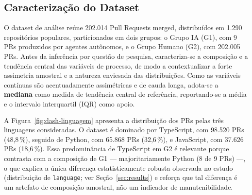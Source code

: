 %
%



\subsection{Caracterização do Dataset}
\label{sec:caracterizacao}

O dataset de análise reúne 202.014 Pull Requests merged, distribuídos em
1.290 repositórios populares, particionados em dois grupos: o Grupo IA (G1),
com 9 PRs produzidos por agentes autônomos, e o Grupo Humano (G2), com
202.005 PRs. Antes da inferência por questão de pesquisa, caracteriza-se a
composição e a tendência central das variáveis de processo, de modo a
contextualizar a forte assimetria amostral e a natureza enviesada das
distribuições. Como as variáveis contínuas são acentuadamente assimétricas e
de cauda longa, adota-se a \textbf{mediana} como medida de tendência central
de referência, reportando-se a média e o intervalo interquartil (IQR) como
apoio.

A Figura~\ref{fig:dash-linguagem} apresenta a distribuição dos PRs pelas três
linguagens consideradas. O dataset é dominado por TypeScript, com 98.520 PRs
(48,8\,\%), seguido de Python, com 65.868 PRs (32,6\,\%), e JavaScript, com
37.626 PRs (18,6\,\%). Essa predominância de TypeScript em G2 é relevante
porque contrasta com a composição de G1 --- majoritariamente Python (8 de 9
PRs) ---, o que explica a única diferença estatisticamente robusta observada
no estudo (distribuição de \texttt{language}; ver Seção~\ref{sec:results}) e
reforça que tal diferença é um artefato de composição amostral, não um
indicador de manutenibilidade.

